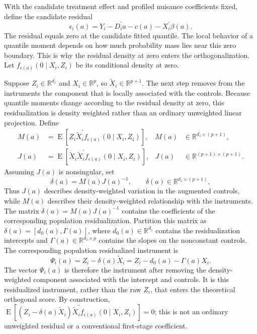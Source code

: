 With the candidate treatment effect and profiled nuisance coefficients fixed, define the candidate residual
\begin{equation}
    \epsilon_i(a)
    =Y_i-D_i^{\prime}a-c(a)-X_i^{\prime}\beta(a).
    \label{eq:profile-residual}
\end{equation}
The residual equals zero at the candidate fitted quantile. The local behavior of a quantile moment depends on how much probability mass lies near this zero boundary. This is why the residual density at zero enters the orthogonalization. Let $f_{\epsilon(a)}(0\mid X_i,Z_i)$ be its conditional density at zero.

Suppose $Z_i\in\mathbb{R}^{d_z}$ and $X_i\in\mathbb{R}^{p}$, so $\widetilde X_i\in\mathbb{R}^{p+1}$. The next step removes from the instruments the component that is locally associated with the controls. Because quantile moments change according to the residual density at zero, this residualization is density weighted rather than an ordinary unweighted linear projection. Define
\begin{equation}
    \begin{aligned}
        M(a)
        &=\operatorname{E}\!\left[
            Z_i\widetilde X_i^{\prime}f_{\epsilon(a)}(0\mid X_i,Z_i)
        \right],
        & M(a)&\in\mathbb{R}^{d_z\times(p+1)},\\
        J(a)
        &=\operatorname{E}\!\left[
            \widetilde X_i\widetilde X_i^{\prime}f_{\epsilon(a)}(0\mid X_i,Z_i)
        \right],
        & J(a)&\in\mathbb{R}^{(p+1)\times(p+1)}.
    \end{aligned}
    \label{eq:profile-MJ}
\end{equation}
Assuming $J(a)$ is nonsingular, set
\begin{equation}
    \delta(a)=M(a)J(a)^{-1},
    \qquad
    \delta(a)\in\mathbb{R}^{d_z\times(p+1)},
    \label{eq:profile-delta}
\end{equation}
Thus $J(a)$ describes density-weighted variation in the augmented controls, while $M(a)$ describes their density-weighted relationship with the instruments. The matrix $\delta(a)=M(a)J(a)^{-1}$ contains the coefficients of the corresponding population residualization. Partition this matrix as $\delta(a)=[d_0(a),\Gamma(a)]$, where $d_0(a)\in\mathbb{R}^{d_z}$ contains the residualization intercepts and $\Gamma(a)\in\mathbb{R}^{d_z\times p}$ contains the slopes on the nonconstant controls. The corresponding population residualized instrument is
\begin{equation}
    \Psi_i(a)
    =Z_i-\delta(a)\widetilde X_i
    =Z_i-d_0(a)-\Gamma(a)X_i.
    \label{eq:profile-residualized-instrument}
\end{equation}
The vector $\Psi_i(a)$ is therefore the instrument after removing the density-weighted component associated with the intercept and controls. It is this residualized instrument, rather than the raw $Z_i$, that enters the theoretical orthogonal score. By construction, $\operatorname{E}[(Z_i-\delta(a)\widetilde X_i)\widetilde X_i^{\prime}f_{\epsilon(a)}(0\mid X_i,Z_i)]=0$; this is not an ordinary unweighted residual or a conventional first-stage coefficient.

